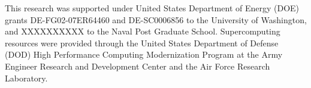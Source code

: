 \documentclass[jgrga, draft]{agutex}
\begin{document}
\begin{article}
\begin{itemize}[leftmargin=+.5in]
\begin{itemize}[leftmargin=+.5in]
\begin{itemize}[leftmargin=+.5in]
\end{itemize}

%
%
%


\begin{acknowledgments}
This research was supported under United States Department of Energy (DOE) grants DE-FG02-07ER64460 and DE-SC0006856 to the University of Washington, and XXXXXXXXXX to the Naval Post Graduate School.
Supercomputing resources were provided through the United States Department of Defense (DOD) High Performance Computing Modernization Program at the Army Engineer Research and Development Center and the Air Force Research Laboratory.
\end{acknowledgments}





%
%
\end{article}


%
%
%
%
\end{document}
